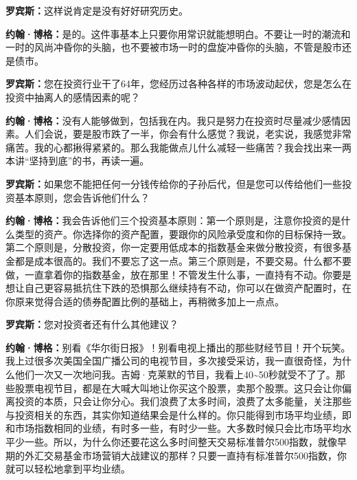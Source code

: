 \begin{BookQuote}
\textbf{罗宾斯：}这样说肯定是没有好好研究历史。
\end{BookQuote}

\begin{BookQuote}
\textbf{约翰·博格：}是的。这件事基本上只要你用常识就能想明白。不要让一时的潮流和一时的风尚冲昏你的头脑，也不要被市场一时的盘旋冲昏你的头脑，不管是股市还是债市。
\end{BookQuote}

\begin{BookQuote}
\textbf{罗宾斯：}您在投资行业干了64年，您经历过各种各样的市场波动起伏，您是怎么在投资中抽离人的感情因素的呢？
\end{BookQuote}

\begin{BookQuote}
\textbf{约翰·博格：}没有人能够做到，包括我在内。我只是努力在投资时尽量减少感情因素。人们会说，要是股市跌了一半，你会有什么感觉？我说，老实说，我感觉非常痛苦。我的心都揪得紧紧的。那么我能做点儿什么减轻一些痛苦？我会找出来一两本讲“坚持到底”的书，再读一遍。
\end{BookQuote}

\begin{BookQuote}
\textbf{罗宾斯：}如果您不能把任何一分钱传给你的子孙后代，但是您可以传给他们一些投资基本原则，您会告诉他们什么？
\end{BookQuote}

\begin{BookQuote}
\textbf{约翰·博格：}我会告诉他们三个投资基本原则：第一个原则是，注意你投资的是什么类型的资产。你选择你的资产配置，要跟你的风险承受度和你的目标保持一致。第二个原则是，分散投资，你一定要用低成本的指数基金来做分散投资，有很多基金都是成本很高的。我们不要忘了这一点。第三个原则是，不要交易。什么都不要做，一直拿着你的指数基金，放在那里！不管发生什么事，一直持有不动。你要是想让自己更容易抵抗住下跌的恐惧那么继续持有不动，你可以在做资产配置时，在你原来觉得合适的债券配置比例的基础上，再稍微多加上一点点。
\end{BookQuote}

\begin{BookQuote}
\textbf{罗宾斯：}您对投资者还有什么其他建议？
\end{BookQuote}

\begin{BookQuote}
\textbf{约翰·博格：}别看《华尔街日报》！别看电视上播出的那些财经节目！开个玩笑。我上过很多次美国全国广播公司的电视节目，多次接受采访，我一直很奇怪，为什么他们一次又一次地问我。吉姆·克莱默的节目，我看上40\textasciitilde{}50秒就受不了了。那些股票电视节目，都是在大喊大叫地让你买这个股票，卖那个股票。这只会让你偏离投资的本质，只会让你分心。我们浪费了太多时间，浪费了太多能量，关注那些与投资相关的东西，其实你知道结果会是什么样的。你只能得到市场平均业绩，即和市场指数相同的业绩，有时多一些，有时少一些。大多数时候只会比市场平均水平少一些。所以，为什么你还要花这么多时间整天交易标准普尔500指数，就像早期的外汇交易基金市场营销大战建议的那样？只要一直持有标准普尔500指数，你就可以轻松地拿到平均业绩。
\end{BookQuote}

